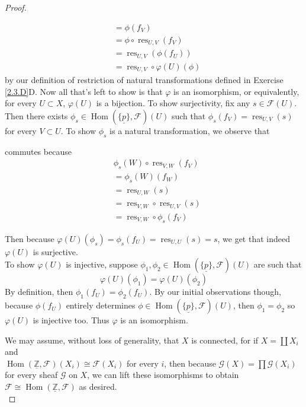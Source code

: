 \documentclass{article}
\newcommand{\Z}{\mathbb{Z}}
\newcommand{\fF}{\mathscr{F}}
\newcommand{\fG}{\mathscr{G}}
\DeclareMathOperator{\res}{\mathrm{res}}
\DeclareMathOperator{\Hom}{\mathrm{Hom}}
\begin{document}
\begin{proof}
\begin{enumerate}[(a)]
\begin{align*}
            &=\phi(f_V)\\
            &=\phi\circ \res_{U,V}(f_V)\\
            &=\res_{U,V}(\phi(f_U))\\
            &=\res_{U,V}\circ \varphi(U)(\phi)
        \end{align*}
        by our definition of restriction of natural transformations defined in Exercise \ref{2.3.D}D. Now all that's left to show is that $\varphi$ is an isomorphism, or equivalently, for every $U\subset X$, $\varphi(U)$ is a bijection. To show surjectivity, fix any $s\in \fF(U)$. Then there exists $\phi_s\in \Hom(\underline{\{p\}},\fF)(U)$ such that $\phi_s(f_V)=\res_{U,V}(s)$ for every $V\subset U$. To show $\phi_s$ is a natural transformation, we observe that
        \begin{center}
        \end{center}
        commutes because
        \begin{align*}
            &\phi_s(W)\circ \res_{V,W}(f_V)\\
            &=\phi_s(W)(f_W)\\
            &=\res_{U,W}(s)\\
            &=\res_{V,W}\circ \res_{U,V}(s)\\
            &=\res_{V,W}\circ \phi_s(f_V)
        \end{align*}
    \end{enumerate}
    Then because $\varphi(U)(\phi_s)=\phi_s(f_U)=\res_{U,U}(s)=s$, we get that indeed $\varphi(U)$ is surjective.\\
    To show $\varphi(U)$ is injective, suppose $\phi_1,\phi_2\in \Hom(\underline{\{p\}},\fF)(U)$ are such that
    \[
    \varphi(U)(\phi_1)=\varphi(U)(\phi_2)
    \]
    By definition, then $\phi_1(f_U)=\phi_2(f_U)$. By our initial observations though, because $\phi(f_U)$ entirely determines $\phi\in \Hom(\underline{\{p\}},\fF)(U)$, then $\phi_1=\phi_2$ so $\varphi(U)$ is injective too. Thus $\varphi$ is an isomorphism.
    \item We may assume, without loss of generality, that $X$ is connected, for if $X=\coprod X_i$ and \\$\Hom(\underline{\Z}, \fF)(X_i)\cong \fF (X_i)$ for every $i$, then because $\fG(X)=\prod \fG(X_i)$ for every sheaf $\fG$ on $X$, we can lift these isomorphisms to obtain $\fF\cong \Hom(\underline{\Z},\fF)$ as desired.\\

\end{proof}
\end{document}
